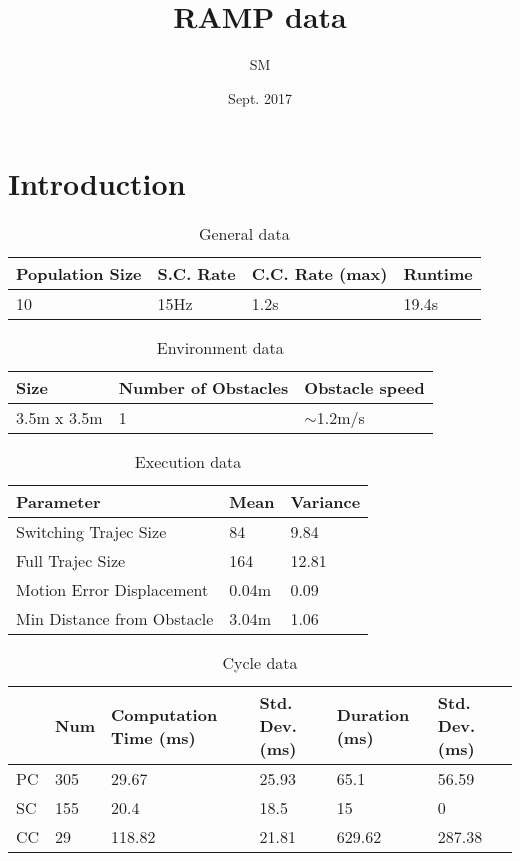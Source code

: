 \documentclass[12pt]{article}
\begin{document}
\author{SM}
\title {RAMP data}
\date {Sept. 2017}

\maketitle


\section {Introduction}


\begin{table}[]
\centering
\caption{General data}
\label{my-label}
\begin{tabular}{|l|l|l|l|}
\hline
Population Size & S.C. Rate & C.C. Rate (max) & Runtime \\ \hline
10              & 15Hz      & 1.2s            & 19.4s   \\ \hline
\end{tabular}
\end{table}


\begin{table}[]
\centering
\caption{Environment data}
\label{my-label}
\begin{tabular}{|l|l|l|}
\hline
Size        & Number of Obstacles & Obstacle speed \\ \hline
3.5m x 3.5m & 1                   & $\sim$1.2m/s   \\ \hline
\end{tabular}
\end{table}


\begin{table}[]
\centering
\caption{Execution data}
\label{my-label}
\begin{tabular}{|l|l|l|}
\hline
Parameter                  & Mean  & Variance \\ \hline
Switching Trajec Size      & 84    & 9.84     \\ \hline
Full Trajec Size           & 164   & 12.81    \\ \hline
Motion Error Displacement  & 0.04m & 0.09     \\ \hline
Min Distance from Obstacle & 3.04m & 1.06     \\ \hline
\end{tabular}
\end{table}

\begin{table}[]
\centering
\caption{Cycle data}
\label{my-label}
\begin{tabular}{|l|l|l|l|l|l|}
\hline
   & Num & Computation Time (ms) & Std. Dev. (ms) & Duration (ms) & Std. Dev. (ms) \\ \hline
PC & 305 & 29.67                 & 25.93         & 65.1          & 56.59         \\ \hline
SC & 155 & 20.4                  & 18.5          & 15            & 0             \\ \hline
CC & 29  & 118.82                & 21.81         & 629.62        & 287.38        \\ \hline
\end{tabular}
\end{table}
\end{document}
